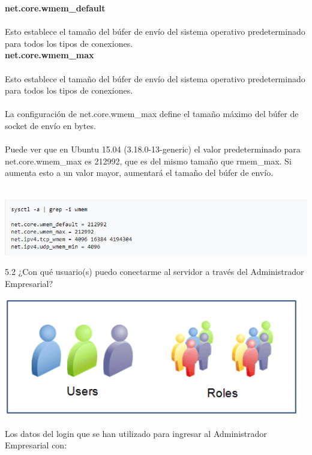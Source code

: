 {\bfseries  net.core.wmem\_default}
\\
\\Esto establece el tamaño del búfer de envío del sistema operativo predeterminado para todos los tipos de conexiones.
\\

{\bfseries  net.core.wmem\_max}
\\
\\Esto establece el tamaño del búfer de envío del sistema operativo predeterminado para todos los tipos de conexiones.
\\
\\La configuración de net.core.wmem\_max define el tamaño máximo del búfer de socket de envío en bytes.
\\
\\
Puede ver que en Ubuntu 15.04 (3.18.0-13-generic) el valor predeterminado para net.core.wmem\_max es 212992, que es del mismo tamaño que rmem\_max. Si aumenta esto a un valor mayor, aumentará el tamaño del búfer de envío.\\
\\
	\begin{center}
		\includegraphics[width=17cm]{./Imagenes/p} 
	\end{center} 

5.2 ¿Con qué usuario(s) puedo conectarme al servidor a través del Administrador
Empresarial?
	\begin{center}
		\includegraphics[width=13cm]{./Imagenes/users-oracle} 
	\end{center} 

	Los datos del login que se han utilizado para ingresar al Administrador Empresarial con:

